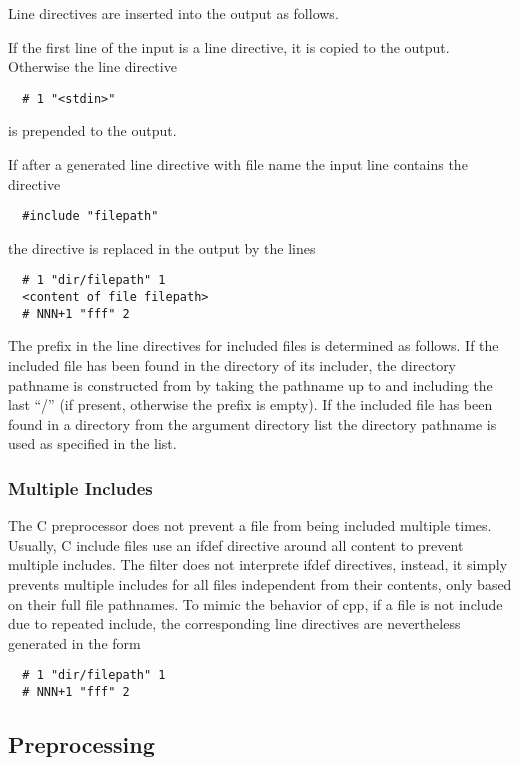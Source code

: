 Line directives are inserted into the output as follows.

If the first line of the input is a line directive, it is copied to the output. Otherwise 
the line directive
\begin{verbatim}
  # 1 "<stdin>"
\end{verbatim}
is prepended to the output.

If after a generated line directive with file name  the input line  contains the 
directive 
\begin{verbatim}
  #include "filepath"
\end{verbatim}
the directive is replaced in the output by the lines 
\begin{verbatim}
  # 1 "dir/filepath" 1
  <content of file filepath>
  # NNN+1 "fff" 2
\end{verbatim}

The  prefix in the line directives for included files is determined as follows. 
If the included file has been found in the 
directory of its includer, the directory pathname is constructed from  by taking the pathname 
up to and including the last ``/'' (if present, otherwise the prefix is empty).
If the included file has been found in a directory from the argument directory list
the directory pathname is used as specified in the list.

\subsubsection{Multiple Includes}

The C preprocessor does not prevent a file from being included multiple times. Usually, C include files use
an ifdef directive around all content to prevent multiple includes. The  filter does
not interprete ifdef directives, instead, it simply prevents multiple includes for all files independent 
from their contents, only based on their full file pathnames. To mimic the behavior of cpp, if a file is 
not include due to repeated include, the corresponding line directives are nevertheless generated in the form
\begin{verbatim}
  # 1 "dir/filepath" 1
  # NNN+1 "fff" 2
\end{verbatim}

\subsection{Preprocessing}
\label{impl-ccode-preproc}

